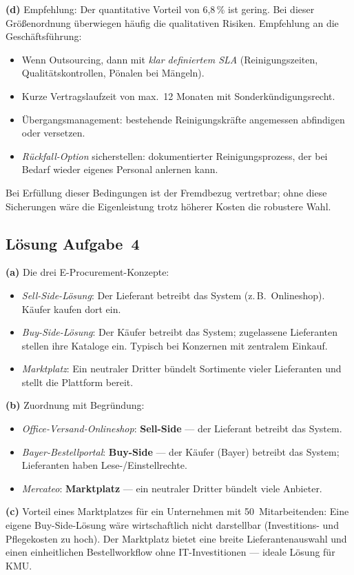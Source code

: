 \documentclass[11pt, a4paper]{article}
\begin{document}
\begin{loesung}
\textbf{(d)} Empfehlung: Der quantitative Vorteil von 6{,}8\,\% ist gering. Bei dieser Größen\-ordnung überwiegen häufig die qualitativen Risiken. Empfehlung an die Geschäftsführung:
\begin{itemize}[itemsep=0pt]
  \item Wenn Outsourcing, dann mit \emph{klar definiertem SLA} (Reinigungs\-zeiten, Qualitäts\-kontrollen, Pönalen bei Mängeln).
  \item Kurze Vertrags\-laufzeit von max.\ 12 Monaten mit Sonder\-kündigungs\-recht.
  \item Übergangs\-management: bestehende Reinigungs\-kräfte angemessen abfindigen oder versetzen.
  \item \emph{Rückfall-Option} sicherstellen: dokumentierter Reinigungs\-prozess, der bei Bedarf wieder eigenes Personal anlernen kann.
\end{itemize}
Bei Erfüllung dieser Bedingungen ist der Fremdbezug vertretbar; ohne diese Sicherungen wäre die Eigenleistung trotz höherer Kosten die robustere Wahl.
\end{loesung}

\subsection*{Lösung Aufgabe~4}
\begin{loesung}
\textbf{(a)} Die drei E-Procurement-Konzepte:
\begin{itemize}[itemsep=0pt]
  \item \emph{Sell-Side-Lösung}: Der Lieferant betreibt das System (z.\,B.\ Onlineshop). Käufer kaufen dort ein.
  \item \emph{Buy-Side-Lösung}: Der Käufer betreibt das System; zugelassene Lieferanten stellen ihre Kataloge ein. Typisch bei Konzernen mit zentralem Einkauf.
  \item \emph{Marktplatz}: Ein neutraler Dritter bündelt Sortimente vieler Lieferanten und stellt die Plattform bereit.
\end{itemize}

\textbf{(b)} Zuordnung mit Begründung:
\begin{itemize}[itemsep=0pt]
  \item \emph{Office-Versand-Onlineshop}: \textbf{Sell-Side} --- der Lieferant betreibt das System.
  \item \emph{Bayer-Bestellportal}: \textbf{Buy-Side} --- der Käufer (Bayer) betreibt das System; Lieferanten haben Lese-/Einstell\-rechte.
  \item \emph{Mercateo}: \textbf{Marktplatz} --- ein neutraler Dritter bündelt viele Anbieter.
\end{itemize}

\textbf{(c)} Vorteil eines Marktplatzes für ein Unternehmen mit 50~Mitarbeitenden: Eine eigene Buy-Side-Lösung wäre wirtschaftlich nicht darstellbar (Investitions- und Pflege\-kosten zu hoch). Der Marktplatz bietet eine breite Lieferanten\-auswahl und einen einheitlichen Bestell\-workflow ohne IT-Investitionen --- ideale Lösung für KMU.
\end{loesung}
\end{document}
